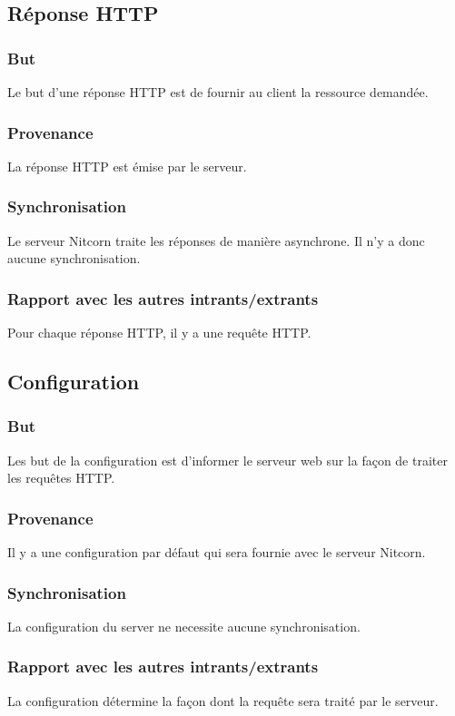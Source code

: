 \documentclass{scrreprt}
\begin{document}
\subsection{Réponse HTTP}
\subsubsection{But} Le but d'une réponse HTTP est de fournir au client la ressource demandée.
\subsubsection{Provenance} La réponse HTTP est émise par le serveur.
\subsubsection{Synchronisation} Le serveur Nitcorn traite les réponses de manière asynchrone. Il n'y a donc aucune synchronisation.
\subsubsection{Rapport avec les autres intrants/extrants} Pour chaque réponse HTTP, il y a une requête HTTP.
\subsection{Configuration}
\subsubsection{But} Les but de la configuration est d'informer le serveur web sur la façon de traiter les requêtes HTTP.
\subsubsection{Provenance} Il y a une configuration par défaut qui sera fournie avec le serveur Nitcorn. 
\subsubsection{Synchronisation} La configuration du server ne necessite aucune synchronisation.
\subsubsection{Rapport avec les autres intrants/extrants} La configuration détermine la façon dont la requête sera traité par le serveur.
\end{document}
